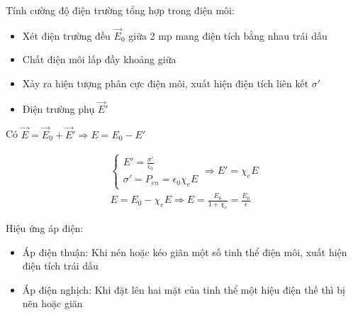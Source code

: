 Tính cường độ điện trường tổng hợp trong điện môi:

\begin{itemize}
  \item Xét điện trường đều $\vec{E}_0$ giữa 2 mp mang điện tích bằng nhau trái dấu
  \item Chất điện môi lấp đầy khoảng giữa
  \item Xảy ra hiện tượng phân cực điện môi, xuất hiện điện tích liên kết $\sigma'$
  \item Điện trường phụ $\vec{E}'$
\end{itemize}

Có $\vec{E} = \vec{E}_0 + \vec{E}' \Rightarrow E = E_0 - E'$

\begin{gather*}
  \begin{cases}
    E' = \frac{\sigma'}{\epsilon_0}\\
    \sigma' = P_{en} = \epsilon_0 \chi_e E
  \end{cases}
  \Rightarrow E' = \chi_e E \\
  E = E_0 - \chi_e E \Rightarrow E = \frac{E_0}{1+\chi_e} = \frac{E_0}{\epsilon}
\end{gather*}

Hiệu ứng áp điện:

\begin{itemize}
  \item Áp điện thuận: Khi nén hoặc kéo giãn một số tinh thể điện môi, xuất hiện điện tích trái dấu
  \item Áp điện nghịch: Khi đặt lên hai mặt của tinh thể một hiệu điện thế thì bị nẽn hoặc giãn
\end{itemize}